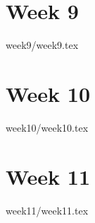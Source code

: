\documentclass[a4paper]{book}
\begin{document}
\chapter{Week 9}

{week9/week9.tex}

\chapter{Week 10}

{week10/week10.tex}

\chapter{Week 11}

{week11/week11.tex}







\end{document}
